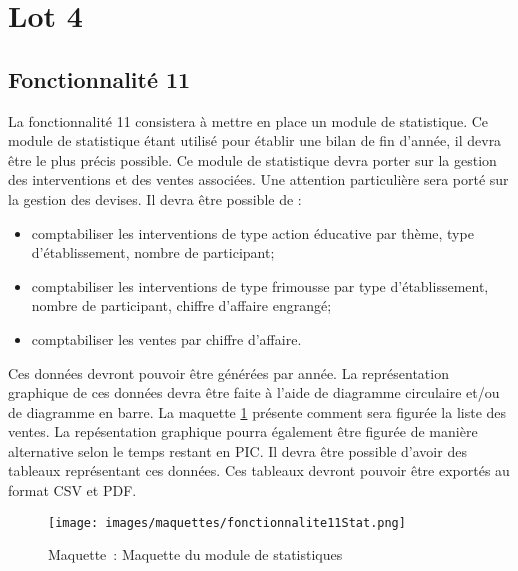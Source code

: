 

\section{Lot 4}
\subsection{Fonctionnalité 11}

La fonctionnalité 11 consistera à mettre en place un module de statistique. Ce module de statistique étant utilisé pour établir une bilan de fin d'année, il devra être le plus précis possible.
Ce module de statistique devra porter sur la gestion des interventions et des ventes associées.
Une attention particulière sera porté sur la gestion des devises.
Il devra être possible de :
\begin{itemize}
\item comptabiliser les interventions de type action éducative par thème, type d'établissement, nombre de participant;
\item comptabiliser les interventions de type frimousse par type d'établissement, nombre de participant, chiffre d'affaire engrangé;
\item comptabiliser les ventes par chiffre d'affaire.
\end{itemize}
Ces données devront pouvoir être générées par année. La représentation graphique de ces données devra être faite à l'aide de diagramme circulaire et/ou de diagramme en barre. La maquette \ref{fonctionnalite11Stat} présente comment sera figurée la liste des ventes. La repésentation graphique pourra également être figurée de manière alternative selon le temps restant en PIC.
Il devra être possible d'avoir des tableaux représentant ces données. Ces tableaux devront pouvoir être exportés au format CSV et PDF.

\begin{figure}[H]
	\centering
	\texttt{[image: images/maquettes/fonctionnalite11Stat.png]}
	 \caption{Maquette~: Maquette du module de statistiques}
	 \label{fonctionnalite11Stat}
\end{figure}
